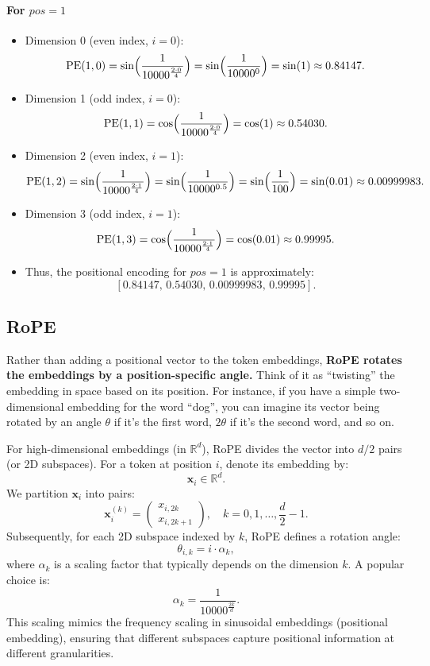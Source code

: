 \paragraph{For \( pos = 1 \)}
\begin{itemize}
\item Dimension 0 (even index, \( i = 0 \)):
\[
\text{PE}(1,0) = \sin\Bigl(\frac{1}{10000^{\frac{2\cdot0}{4}}}\Bigr) = \sin\Bigl(\frac{1}{10000^0}\Bigr) = \sin(1) \approx 0.84147.
\]

\item Dimension 1 (odd index, \( i = 0 \)):
\[
\text{PE}(1,1) = \cos\Bigl(\frac{1}{10000^{\frac{2\cdot0}{4}}}\Bigr) = \cos(1) \approx 0.54030.
\]
\item Dimension 2 (even index, \( i = 1 \)):
\[
\text{PE}(1,2) = \sin\Bigl(\frac{1}{10000^{\frac{2\cdot1}{4}}}\Bigr) = \sin\Bigl(\frac{1}{10000^{0.5}}\Bigr) = \sin\Bigl(\frac{1}{100}\Bigr) = \sin(0.01) \approx 0.00999983.
\]

\item Dimension 3 (odd index, \( i = 1 \)):
\[
\text{PE}(1,3) = \cos\Bigl(\frac{1}{10000^{\frac{2\cdot1}{4}}}\Bigr) = \cos(0.01) \approx 0.99995.
\]
\item Thus, the positional encoding for \( pos = 1 \) is approximately:
\[
[0.84147,\, 0.54030,\, 0.00999983,\, 0.99995].
\]
\end{itemize}


\subsection{RoPE}

Rather than adding a positional vector to the token embeddings, \textbf{RoPE rotates the embeddings by a position-specific angle.} Think of it as ``twisting'' the embedding in space based on its position. For instance, if you have a simple two-dimensional embedding for the word ``dog'', you can imagine its vector being rotated by an angle \(\theta\) if it's the first word, \(2\theta\) if it’s the second word, and so on.

For high-dimensional embeddings (\eg in \(\mathbb{R}^d\)), RoPE divides the vector into \(d/2\) pairs (or 2D subspaces). For a token at position \(i\), denote its embedding by:
\[
\mathbf{x}_i \in \mathbb{R}^d.
\]
We partition \(\mathbf{x}_i\) into pairs:
\[
\mathbf{x}_i^{(k)} = 
\begin{pmatrix}
x_{i,2k} \\
x_{i,2k+1}
\end{pmatrix},\quad k = 0, 1, \ldots, \frac{d}{2}-1.
\]
Subsequently, for each 2D subspace indexed by \(k\), RoPE defines a rotation angle:
\[
\theta_{i, k} = i \cdot \alpha_k,
\]
where \(\alpha_k\) is a scaling factor that typically depends on the dimension \(k\). A popular choice is:
\[
\alpha_k = \frac{1}{10000^{\frac{2k}{d}}}.
\]
This scaling mimics the frequency scaling in sinusoidal embeddings (\ie positional embedding), ensuring that different subspaces capture positional information at different granularities.

